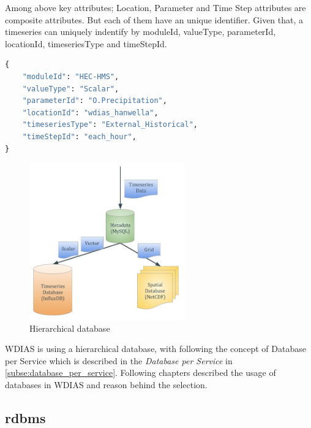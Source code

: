 Among above key attributes; Location, Parameter and Time Step attributes are composite attributes. But each of them have an unique identifier.
Given that, a timeseries can uniquely indentify by moduleId, valueType, parameterId, locationId, timeseriesType and timeStepId.
\begin{lstlisting}[language=Python]
{
	"moduleId": "HEC-HMS",
	"valueType": "Scalar",
	"parameterId": "O.Precipitation",
	"locationId": "wdias_hanwella",
	"timeseriesType": "External_Historical",
	"timeStepId": "each_hour",
}
\end{lstlisting}

\begin{figure}[htp]
    \centering
    \includegraphics[width=0.6\textwidth]{method/microservice/hierarchical_database.jpg}
    \caption{Hierarchical database}
    \label{fi:hierarchical_database}
\end{figure}


WDIAS is using a hierarchical database, with following the concept of Database per Service which is described in the \emph{Database per Service} in \cref{subse:database_per_service}.
Following chapters described the usage of databases in WDIAS and reason behind the selection.

\subsection{\acrshort{rdbms}}
\label{subse:mysql}

